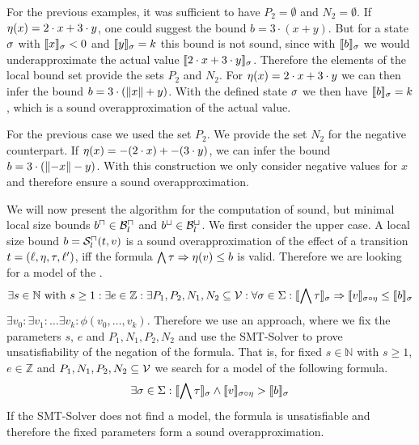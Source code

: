 For the previous examples, it was sufficient to have $P_2 = \emptyset$ and $N_2 = \emptyset$.
If $\eta(x) = 2 \cdot x + 3 \cdot y$, one could suggest the bound $b = 3 \cdot (x + y)$.
But for a state $\sigma$ with $\llbracket x \rrbracket_{\sigma} < 0$ and $\llbracket y \rrbracket_{\sigma} = k$ this bound is not sound, since with $\llbracket b \rrbracket_{\sigma}$ we would underapproximate the actual value $\llbracket 2 \cdot x + 3 \cdot y \rrbracket_{\sigma}$.
Therefore the elements of the local bound set provide the sets $P_2$ and $N_2$.
For $\eta(x) = 2 \cdot x + 3 \cdot y$ we can then infer the bound $b = 3 \cdot (\left\Vert x\right\Vert + y)$.
With the defined state $\sigma$ we then have $\llbracket b \rrbracket_{\sigma} = k$, which is a sound overapproximation of the actual value. 

For the previous case we used the set $P_2$.
We provide the set $N_2$ for the negative counterpart.
If $\eta(x) = -(2 \cdot x) + -(3 \cdot y)$, we can infer the bound $b = 3 \cdot (\left\Vert-x\right\Vert - y)$.
With this construction we only consider negative values for $x$ and therefore ensure a sound overapproximation.

We will now present the algorithm for the computation of sound, but minimal local size bounds $b^\sqcap \in \mathcal{B}^\sqcap_l$ and $b^\sqcup \in \mathcal{B}^\sqcup_l$.
We first consider the upper case.
A local size bound $b = {\mathcal{S}^\sqcap_l}(t,v)$ is a sound overapproximation of the effect of a transition $t = (\ell,\eta,\tau,\ell')$, iff the formula $\bigwedge \tau \Rightarrow \eta(v) \leq b$ is valid.
Therefore we are looking for a model of the .
\[ \exists s \in \mathbb{N} \text{ with } s \geq 1:
\exists e \in \mathbb{Z}:
\exists P_1, P_2, N_1, N_2 \subseteq \mathcal{V}:
\forall \sigma \in \Sigma:
\llbracket \bigwedge \tau \rrbracket_{\sigma} \Rightarrow \llbracket v \rrbracket_{\sigma \circ \eta} \leq \llbracket b \rrbracket_{\sigma} \]
 $\exists v_0: \exists v_1: \dots \exists v_k: \phi(v_0, \dots, v_k)$.
Therefore we use an approach, where we fix the parameters $s$, $e$ and $P_1, N_1, P_2, N_2$ and use the SMT-Solver to prove unsatisfiability of the negation of the formula.
That is, for fixed $s \in \mathbb{N}$ with $s \geq 1$, $e \in \mathbb{Z}$ and $P_1, N_1, P_2, N_2 \subseteq \mathcal{V}$ we search for a model of the following formula.
\[ \exists \sigma \in \Sigma: \llbracket \bigwedge \tau \rrbracket_{\sigma} \wedge \llbracket v \rrbracket_{\sigma \circ \eta} > \llbracket b \rrbracket_{\sigma} \]
If the SMT-Solver does not find a model, the formula is unsatisfiable and therefore the fixed parameters form a sound overapproximation.

